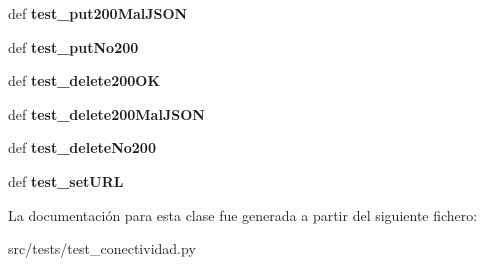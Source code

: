 \begin{DoxyCompactItemize}
\item 
\hypertarget{classsrc_1_1tests_1_1test__conectividad_1_1_test_conectividad_a1eaa743ad7b0b106be8854df1d5b34c7}{def {\bfseries test\-\_\-put200\-Mal\-J\-S\-O\-N}}\label{classsrc_1_1tests_1_1test__conectividad_1_1_test_conectividad_a1eaa743ad7b0b106be8854df1d5b34c7}

\item 
\hypertarget{classsrc_1_1tests_1_1test__conectividad_1_1_test_conectividad_a9b93248598f6aa551eb0050563dafb3d}{def {\bfseries test\-\_\-put\-No200}}\label{classsrc_1_1tests_1_1test__conectividad_1_1_test_conectividad_a9b93248598f6aa551eb0050563dafb3d}

\item 
\hypertarget{classsrc_1_1tests_1_1test__conectividad_1_1_test_conectividad_a12a6018f85e7e335a349026020db2051}{def {\bfseries test\-\_\-delete200\-O\-K}}\label{classsrc_1_1tests_1_1test__conectividad_1_1_test_conectividad_a12a6018f85e7e335a349026020db2051}

\item 
\hypertarget{classsrc_1_1tests_1_1test__conectividad_1_1_test_conectividad_a9daa32aa5ecb940f33f853b6cb66ecc3}{def {\bfseries test\-\_\-delete200\-Mal\-J\-S\-O\-N}}\label{classsrc_1_1tests_1_1test__conectividad_1_1_test_conectividad_a9daa32aa5ecb940f33f853b6cb66ecc3}

\item 
\hypertarget{classsrc_1_1tests_1_1test__conectividad_1_1_test_conectividad_a5e7c145fe6d1e8de979634fba5252305}{def {\bfseries test\-\_\-delete\-No200}}\label{classsrc_1_1tests_1_1test__conectividad_1_1_test_conectividad_a5e7c145fe6d1e8de979634fba5252305}

\item 
\hypertarget{classsrc_1_1tests_1_1test__conectividad_1_1_test_conectividad_a419263ce52abed50d41ffca970ddccb7}{def {\bfseries test\-\_\-set\-U\-R\-L}}\label{classsrc_1_1tests_1_1test__conectividad_1_1_test_conectividad_a419263ce52abed50d41ffca970ddccb7}

\end{DoxyCompactItemize}


La documentación para esta clase fue generada a partir del siguiente fichero\-:\begin{DoxyCompactItemize}
\item 
src/tests/test\-\_\-conectividad.\-py\end{DoxyCompactItemize}
